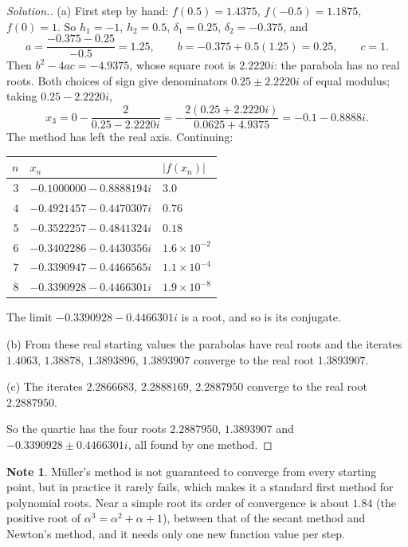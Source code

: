 \documentclass[11pt,a4paper]{article}
\numberwithin{equation}{section}
\theoremstyle{definition}
\newtheorem*{note}{Note}
\newenvironment{solution}
  {\renewcommand{\qedsymbol}{}\begin{proof}[\textit{Solution}.]}
  {\end{proof}}
\begin{document}
\begin{solution}
(a) First step by hand: $f(0.5) = 1.4375$, $f(-0.5) = 1.1875$, $f(0) = 1$. So $h_1 = -1$, $h_2 = 0.5$, $\delta_1 = 0.25$, $\delta_2 = -0.375$,
and
$$a = \frac{-0.375-0.25}{-0.5} = 1.25,\qquad b = -0.375+0.5(1.25) = 0.25,\qquad c = 1 .$$
Then $b^2-4ac = -4.9375$, whose square root is $2.2220i$: the parabola has no real roots. Both choices of sign give denominators
$0.25\pm2.2220i$ of equal modulus; taking $0.25-2.2220i$,
$$x_3 = 0-\frac{2}{0.25-2.2220i} = -\frac{2(0.25+2.2220i)}{0.0625+4.9375} = -0.1-0.8888i .$$
The method has left the real axis. Continuing:
\begin{center}
\begin{tabular}{rll}
\hline
$n$ & $x_n$ & $|f(x_n)|$\\
\hline
$3$ & $-0.1000000-0.8888194i$ & $3.0$\\
$4$ & $-0.4921457-0.4470307i$ & $0.76$\\
$5$ & $-0.3522257-0.4841324i$ & $0.18$\\
$6$ & $-0.3402286-0.4430356i$ & $1.6\times10^{-2}$\\
$7$ & $-0.3390947-0.4466565i$ & $1.1\times10^{-4}$\\
$8$ & $-0.3390928-0.4466301i$ & $1.9\times10^{-8}$\\
\hline
\end{tabular}
\end{center}
The limit $-0.3390928-0.4466301i$ is a root, and so is its conjugate.

(b) From these real starting values the parabolas have real roots and the iterates $1.4063$, $1.38878$, $1.3893896$, $1.3893907$ converge to the
real root $1.3893907$.

(c) The iterates $2.2866683$, $2.2888169$, $2.2887950$ converge to the real root $2.2887950$.

So the quartic has the four roots $2.2887950$, $1.3893907$ and $-0.3390928\pm0.4466301i$, all found by one method.
\end{solution}

\begin{note}
M\"uller's method is not guaranteed to converge from every starting point, but in practice it rarely fails, which makes it a standard
first method for polynomial roots. Near a simple root its order of convergence is about $1.84$ (the positive root of $\alpha^3 =
\alpha^2+\alpha+1$), between that of the secant method and Newton's method, and it needs only one new function value per step.
\end{note}
\end{document}
